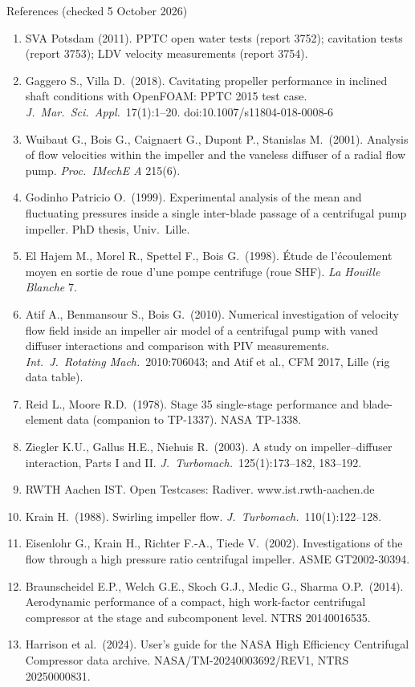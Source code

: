 \documentclass[aspectratio=169,10pt]{beamer}
\begin{document}
\begin{frame}[allowframebreaks]{References (checked 5 October 2026)}
\begin{enumerate}
\item SVA Potsdam (2011). PPTC open water tests (report 3752); cavitation tests (report 3753); LDV velocity measurements (report 3754).
\item Gaggero S., Villa D.\ (2018). Cavitating propeller performance in inclined shaft conditions with OpenFOAM: PPTC 2015 test case. \emph{J.\ Mar.\ Sci.\ Appl.}\ 17(1):1--20. doi:10.1007/s11804-018-0008-6
\item Wuibaut G., Bois G., Caignaert G., Dupont P., Stanislas M.\ (2001). Analysis of flow velocities within the impeller and the vaneless diffuser of a radial flow pump. \emph{Proc.\ IMechE A} 215(6).
\item Godinho Patricio O.\ (1999). Experimental analysis of the mean and fluctuating pressures inside a single inter-blade passage of a centrifugal pump impeller. PhD thesis, Univ.\ Lille.
\item El Hajem M., Morel R., Spettel F., Bois G.\ (1998). Étude de l'écoulement moyen en sortie de roue d'une pompe centrifuge (roue SHF). \emph{La Houille Blanche} 7.
\item Atif A., Benmansour S., Bois G.\ (2010). Numerical investigation of velocity flow field inside an impeller air model of a centrifugal pump with vaned diffuser interactions and comparison with PIV measurements. \emph{Int.\ J.\ Rotating Mach.}\ 2010:706043; and Atif et al., CFM 2017, Lille (rig data table).
\item Reid L., Moore R.D.\ (1978). Stage 35 single-stage performance and blade-element data (companion to TP-1337). NASA TP-1338.
\item Ziegler K.U., Gallus H.E., Niehuis R.\ (2003). A study on impeller--diffuser interaction, Parts I and II. \emph{J.\ Turbomach.}\ 125(1):173--182, 183--192.
\item RWTH Aachen IST. Open Testcases: Radiver. www.ist.rwth-aachen.de
\item Krain H.\ (1988). Swirling impeller flow. \emph{J.\ Turbomach.}\ 110(1):122--128.
\item Eisenlohr G., Krain H., Richter F.-A., Tiede V.\ (2002). Investigations of the flow through a high pressure ratio centrifugal impeller. ASME GT2002-30394.
\item Braunscheidel E.P., Welch G.E., Skoch G.J., Medic G., Sharma O.P.\ (2014). Aerodynamic performance of a compact, high work-factor centrifugal compressor at the stage and subcomponent level. NTRS 20140016535.
\item Harrison et al.\ (2024). User's guide for the NASA High Efficiency Centrifugal Compressor data archive. NASA/TM-20240003692/REV1, NTRS 20250000831.

\end{enumerate}
\end{frame}
\end{document}
